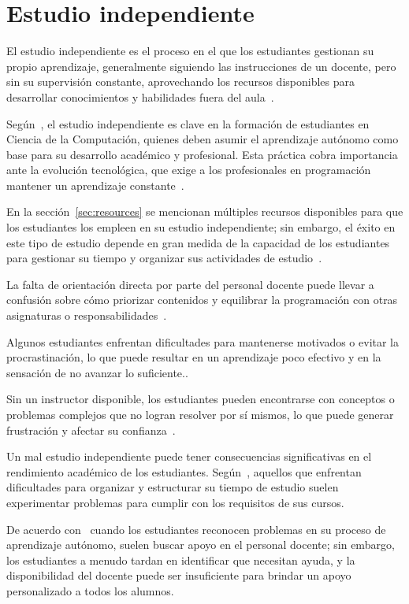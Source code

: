 \documentclass{article}
\begin{document}
\section{Estudio independiente}

El estudio independiente es el proceso en el que los estudiantes gestionan su propio aprendizaje, generalmente siguiendo las instrucciones de un docente, pero sin su supervisión constante, aprovechando los recursos disponibles para desarrollar conocimientos y habilidades fuera del aula~\cite{proskuraLytvynova2020}.

Según~\cite{proskuraLytvynova2020}, el estudio independiente es clave en la formación de estudiantes en Ciencia de la Computación, quienes deben asumir el aprendizaje autónomo como base para su desarrollo académico y profesional. Esta práctica cobra importancia ante la evolución tecnológica, que exige a los profesionales en programación mantener un aprendizaje constante~\cite{proskuraLytvynova2020}.

En la sección~\ref{sec:resources} se mencionan múltiples recursos disponibles para que los estudiantes los empleen en su estudio independiente; sin embargo, el éxito en este tipo de estudio depende en gran medida de la capacidad de los estudiantes para gestionar su tiempo y organizar sus actividades de estudio~\cite{overklift2019}.

La falta de orientación directa por parte del personal docente puede llevar a confusión sobre cómo priorizar contenidos y equilibrar la programación con otras asignaturas o responsabilidades~\cite{proskuraLytvynova2020}. 

Algunos estudiantes enfrentan dificultades para mantenerse motivados o evitar la procrastinación, lo que puede resultar en un aprendizaje poco efectivo y en la sensación de no avanzar lo suficiente.\cite{coto02012022}. 

Sin un instructor disponible, los estudiantes pueden encontrarse con conceptos o problemas complejos que no logran resolver por sí mismos, lo que puede generar frustración y afectar su confianza~\cite{overklift2019}.

Un mal estudio independiente puede tener consecuencias significativas en el rendimiento académico de los estudiantes. Según~\cite{overklift2019}, aquellos que enfrentan dificultades para organizar y estructurar su tiempo de estudio suelen experimentar problemas para cumplir con los requisitos de sus cursos.

De acuerdo con~\cite{overklift2019} cuando los estudiantes reconocen problemas en su proceso de aprendizaje autónomo, suelen buscar apoyo en el personal docente; sin embargo, los estudiantes a menudo tardan en identificar que necesitan ayuda, y la disponibilidad del docente puede ser insuficiente para brindar un apoyo personalizado a todos los alumnos.
\end{document}
